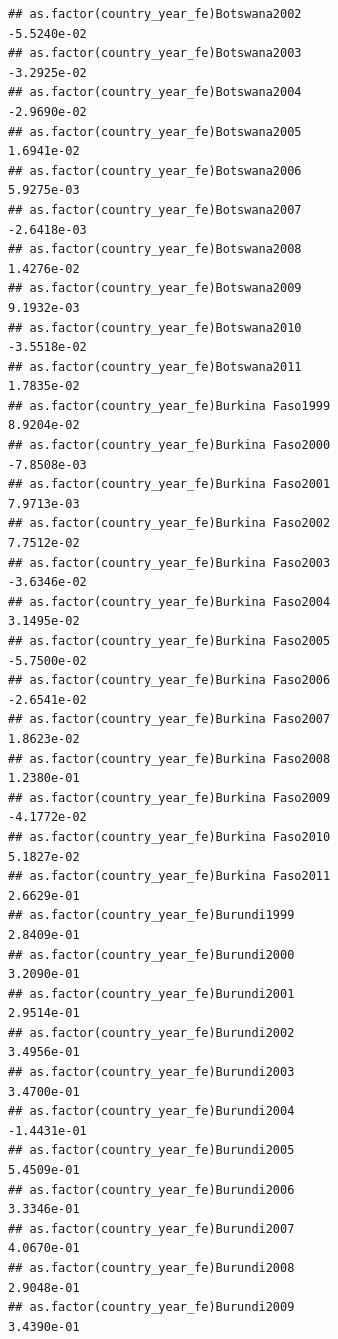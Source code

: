 \documentclass[
  a4paper,
]{article}
\begin{document}
\begin{verbatim}
## as.factor(country_year_fe)Botswana2002                         -5.5240e-02
## as.factor(country_year_fe)Botswana2003                         -3.2925e-02
## as.factor(country_year_fe)Botswana2004                         -2.9690e-02
## as.factor(country_year_fe)Botswana2005                          1.6941e-02
## as.factor(country_year_fe)Botswana2006                          5.9275e-03
## as.factor(country_year_fe)Botswana2007                         -2.6418e-03
## as.factor(country_year_fe)Botswana2008                          1.4276e-02
## as.factor(country_year_fe)Botswana2009                          9.1932e-03
## as.factor(country_year_fe)Botswana2010                         -3.5518e-02
## as.factor(country_year_fe)Botswana2011                          1.7835e-02
## as.factor(country_year_fe)Burkina Faso1999                      8.9204e-02
## as.factor(country_year_fe)Burkina Faso2000                     -7.8508e-03
## as.factor(country_year_fe)Burkina Faso2001                      7.9713e-03
## as.factor(country_year_fe)Burkina Faso2002                      7.7512e-02
## as.factor(country_year_fe)Burkina Faso2003                     -3.6346e-02
## as.factor(country_year_fe)Burkina Faso2004                      3.1495e-02
## as.factor(country_year_fe)Burkina Faso2005                     -5.7500e-02
## as.factor(country_year_fe)Burkina Faso2006                     -2.6541e-02
## as.factor(country_year_fe)Burkina Faso2007                      1.8623e-02
## as.factor(country_year_fe)Burkina Faso2008                      1.2380e-01
## as.factor(country_year_fe)Burkina Faso2009                     -4.1772e-02
## as.factor(country_year_fe)Burkina Faso2010                      5.1827e-02
## as.factor(country_year_fe)Burkina Faso2011                      2.6629e-01
## as.factor(country_year_fe)Burundi1999                           2.8409e-01
## as.factor(country_year_fe)Burundi2000                           3.2090e-01
## as.factor(country_year_fe)Burundi2001                           2.9514e-01
## as.factor(country_year_fe)Burundi2002                           3.4956e-01
## as.factor(country_year_fe)Burundi2003                           3.4700e-01
## as.factor(country_year_fe)Burundi2004                          -1.4431e-01
## as.factor(country_year_fe)Burundi2005                           5.4509e-01
## as.factor(country_year_fe)Burundi2006                           3.3346e-01
## as.factor(country_year_fe)Burundi2007                           4.0670e-01
## as.factor(country_year_fe)Burundi2008                           2.9048e-01
## as.factor(country_year_fe)Burundi2009                           3.4390e-01

\end{verbatim}
\end{document}
